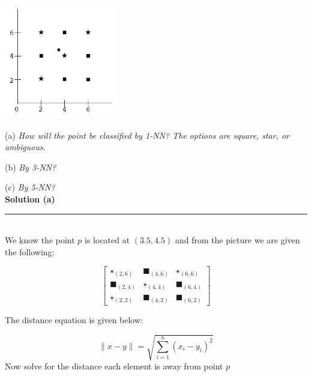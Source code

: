 \documentclass{article}
\begin{document}
\begin{center}
\includegraphics[height=5cm, keepaspectratio]{./dsc_255_hw1_5.png}
\end{center}

(a) \textit{How will the point be classified by 1-NN? The options are square, star, or ambiguous.}

(b) \textit{By 3-NN?}

(c) \textit{By 5-NN?}\\


\textbf{Solution (a)}

\noindent\rule{\textwidth}{0.4pt}\\

We know the point $p$ is located at $(3.5,4.5)$ and from the picture we are given the following:

$$\begin{bmatrix}\star_{(2,6)} & \blacksquare_{(4,6)} & \star_{(6,6)} \\ \blacksquare_{(2,4)} & \star_{(4,4)} & \blacksquare_{(6,4)} \\ \star_{(2,2)} & \blacksquare_{(4,2)} & \blacksquare_{(6,2)}\end{bmatrix}$$

The distance equation is given below:

$$\|x-y\| = \sqrt{\sum_{i=1}^{n} (x_i - y_i)^2}$$
\newpage
Now solve for the distance each element is away from point $p$
\end{document}
